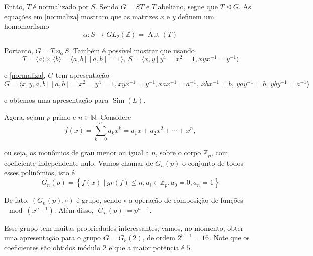 \documentclass[a4paper,portuguese,11pt,twoside, leqno]{book}
\DeclareMathOperator{\aut}{Aut}
\DeclareMathOperator{\Sim}{Sim}
\theoremstyle{definition}
\begin{document}
	\par\vspace{0.3cm} Então, $T$ é normalizado por $S$. Sendo $G=ST$ e $T$ abeliano, segue que $T\trianglelefteq G$. As equações em \eqref{normaliza} mostram que as matrizes $x$ e $y$ definem um homomorfismo 
	\begin{equation*}
	\alpha: S\to GL_2(\mathbb{Z}) = \aut(T)
	\end{equation*}
	\par\vspace{0.3cm} Portanto, $G = T\rtimes_{\alpha} S$. Também é possível mostrar que usando
	\begin{equation*}
	T = \langle a \rangle \times \langle b \rangle = \langle a,b \ | \ [a,b]=1 \rangle, \ S = \langle x,y \ | \ y^4=x^2=1, xyx^{-1} = y^{-1} \rangle
	\end{equation*}
	\par\vspace{0.3cm} e \eqref{normaliza}, $G$ tem apresentação
	\begin{equation*}
	G = \langle x,y,a,b \ | \ [a,b]=x^2=y^4=1,xyx^{-1} = y^{-1}, xax^{-1} = a^{-1}, \ xbx^{-1} = b, \ yay^{-1} = b, \ yby^{-1} = a^{-1} \rangle
	\end{equation*}
	\par\vspace{0.3cm} e obtemos uma apresentação para $\Sim(L)$.
	\par\vspace{0.3cm} Agora, sejam $p$ primo e $n\in\mathbb{N}$. Considere
	\begin{equation*}
	f(x) = \sum_{k=0}^{n}a_kx^k = a_1x + a_2x^2 + \cdots + x^n, 
	\end{equation*}
	\par\vspace{0.3cm} ou seja, os monômios de grau menor ou igual a $n$, sobre o corpo $\mathbb{Z}_p$, com coeficiente independente nulo. Vamos chamar de $G_n(p)$ o conjunto de todos esses polinômios, isto é
	\begin{equation*}
	G_n(p) = \left\{ f(x) \ | \ gr(f)\leq n, a_i\in\mathbb{Z}_p, a_0=0,a_n=1 \right\}
	\end{equation*}
	\par\vspace{0.3cm} De fato, $( G_n(p), \circ )$ é grupo, sendo $\circ$ a operação de composição de funções $\mod(x^{n+1})$. Além disso, $|G_n(p)| = p^{n-1}$.
	\par\vspace{0.3cm} Esse grupo tem muitas propriedades interessantes; vamos, no momento, obter uma apresentação para o grupo $G = G_5(2)$, de ordem $2^{5-1} = 16$. Note que os coeficientes são obtidos módulo $2$ e que a maior potência é $5$.
\end{document}
